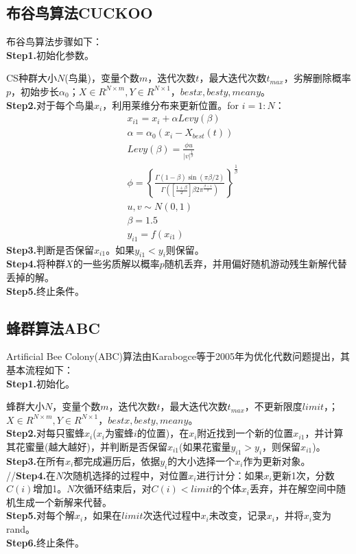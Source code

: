     \subsection{布谷鸟算法CUCKOO}
        \par
        布谷鸟算法步骤如下：\\
        \textbf{Step1.}初始化参数。
        \par
        CS种群大小$N$(鸟巢)，变量个数$m$，迭代次数$t$，最大迭代次数$t_{max}$，劣解删除概率$p$，初始步长$\alpha_0$；$X\in R^{N\times m},Y\in R^{N\times 1}$，$bestx,besty,meany$。\\
        \textbf{Step2.}对于每个鸟巢$x_i$，利用莱维分布来更新位置。for $i = 1:N$：
        \begin{align*}
        & x_{i1} = x_i+\alpha Levy(\beta)\\
        & \alpha = \alpha_0(x_i - X_{best}(t))\\
        & Levy(\beta) = \frac{\phi u}{|v|^{\frac{1}{\beta}}}\\
        & \phi = \left\{ \frac{\Gamma(1-\beta)\sin(\pi\beta/2)}{\Gamma \left( [\frac{1+\beta}{2}]\beta 2\pi^{\frac{\beta-1}{2}} \right) }  \right\}^{\frac{1}{\beta}}\\
        & u,v\sim N(0,1)\\
        & \beta = 1.5\\
        & y_{i1} = f(x_{i1})
        \end{align*}
        \textbf{Step3.}判断是否保留$x_{i1}$。如果$y_{i1}<y_i$则保留。\\
        \textbf{Step4.}将种群$X$的一些劣质解以概率$p$随机丢弃，并用偏好随机游动残生新解代替丢掉的解。\\
        \textbf{Step5.}终止条件。

    \subsection{蜂群算法ABC}
        \par
        Artificial Bee Colony(ABC)算法由Karabogce等于2005年为优化代数问题提出，其基本流程如下：\\
        \textbf{Step1.}初始化。
        \par
        蜂群大小$N$，变量个数$m$，迭代次数$t$，最大迭代次数$t_{max}$，不更新限度$limit$，；$X\in R^{N\times m},Y\in R^{N\times 1}$，$bestx,besty,meany$。\\
        \textbf{Step2.}对每只蜜蜂$x_i$($x_i$为蜜蜂$i$的位置)，在$x_i$附近找到一个新的位置$x_{i1}$，并计算其花蜜量(越大越好)，并判断是否保留$x_{i1}$(如果花蜜量$y_{i1}>y_i$，则保留$x_{i1}$)。\\
        \textbf{Step3.}在所有$x_i$都完成遍历后，依据$y_i$的大小选择一个$x_i$作为更新对象。\\
        //\textbf{Step4.}在$N$次随机选择的过程中，对位置$x_i$进行计分：如果$x_i$更新1次，分数$C(i)$增加1。$N$次循环结束后，对$C(i)<limit$的个体$x_i$丢弃，并在解空间中随机生成一个新解来代替。\\
        \textbf{Step5.}对每个解$x_i$，如果在$limit$次迭代过程中$x_i$未改变，记录$x_i$，并将$x_i$变为rand。\\
        \textbf{Step6.}终止条件。

